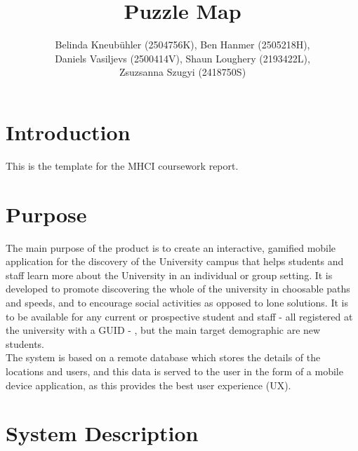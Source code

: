 \documentclass[10pt,twocolumn]{article} %
\author{
  Belinda Kneubühler (2504756K), Ben Hanmer (2505218H),\\
  Daniels Vasiljevs (2500414V), Shaun Loughery (2193422L),\\
  Zsuzsanna Szugyi (2418750S)}
\title{Puzzle Map}
\date{} %
\begin{document}
\maketitle


\section*{Introduction}

This is the template for the MHCI coursework report.

\section*{Purpose}

The main purpose of the product is to create an interactive, gamified mobile application for the discovery of the University campus that helps students and staff learn more about the University in an individual or group setting. It is developed to promote discovering the whole of the university in choosable paths and speeds,  and to encourage social activities as opposed to lone solutions. It is to be available for any current or prospective student and staff - all registered at the university with a GUID - , but the main target demographic are new students.\\
The system is based on a remote database which stores the details of the locations and users, and this data is served to the user in the form of a mobile device application, as this provides the best user experience (UX).

\section*{System Description}
\end{document}
